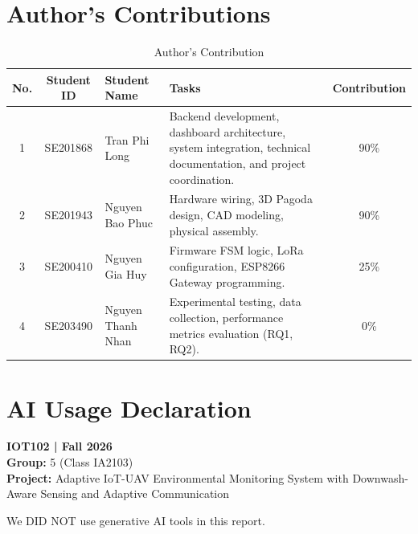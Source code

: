 \documentclass[11pt, a4paper]{article}
\begin{document}
\section*{Author's Contributions}

\begin{table}[htbp]
\caption{Author's Contribution}
\begin{center}
\renewcommand{\arraystretch}{1.3} %
\begin{tabular}{|c|c|p{4cm}|p{6cm}|c|}
\hline
\textbf{No.} & \textbf{Student ID} & \textbf{Student Name} & \textbf{Tasks} & \textbf{Contribution} \\
\hline
1 & SE201868 & Tran Phi Long & Backend development, dashboard architecture, system integration, technical documentation, and project coordination. & 90\% \\
\hline
2 & SE201943 & Nguyen Bao Phuc & Hardware wiring, 3D Pagoda design, CAD modeling, physical assembly. & 90\% \\
\hline
3 & SE200410 & Nguyen Gia Huy & Firmware FSM logic, LoRa configuration, ESP8266 Gateway programming. & 25\% \\
\hline
4 & SE203490 & Nguyen Thanh Nhan & Experimental testing, data collection, performance metrics evaluation (RQ1, RQ2). & 0\% \\
\hline
\end{tabular}
\label{tab:contribution}
\end{center}
\end{table}

\newpage
\section*{AI Usage Declaration}
\textbf{IOT102 | Fall 2026} \\
\textbf{Group:} 5 (Class IA2103) \\
\textbf{Project:} Adaptive IoT-UAV Environmental Monitoring System with Downwash-Aware Sensing and Adaptive Communication

\vspace{0.3cm}
\noindent [~~] We DID NOT use generative AI tools in this report. \\
\end{document}
